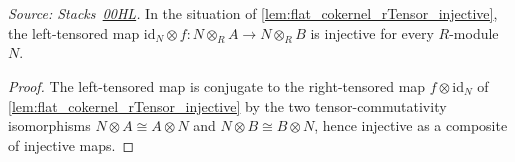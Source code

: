 \begin{lemma}
  \label{lem:flat_cokernel_lTensor_injective}
  \textit{Source: Stacks~\href{https://stacks.math.columbia.edu/tag/00HL}{00HL}.}
  In the situation of \cref{lem:flat_cokernel_rTensor_injective}, the
  left-tensored map \(\mathrm{id}_N \otimes f : N \otimes_R A \to N \otimes_R
  B\) is injective for every \(R\)-module \(N\).
\end{lemma}
\begin{proof}\leanok
  The left-tensored map is conjugate to the right-tensored map
  \(f \otimes \mathrm{id}_N\) of \cref{lem:flat_cokernel_rTensor_injective} by
  the two tensor-commutativity isomorphisms \(N \otimes A \cong A \otimes N\)
  and \(N \otimes B \cong B \otimes N\), hence injective as a composite of
  injective maps.
\end{proof}

